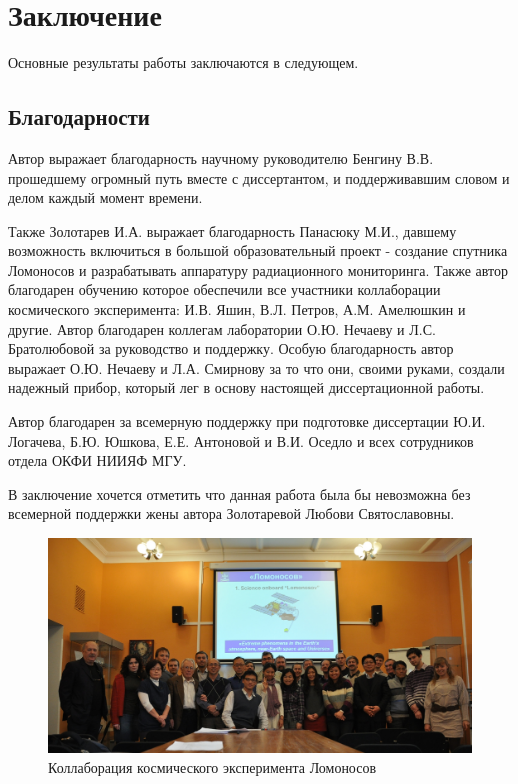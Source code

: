 \chapter*{Заключение}						%


Основные результаты работы заключаются в следующем.

\section{Благодарности}
Автор выражает благодарность научному руководителю Бенгину В.В. прошедшему огромный путь вместе с диссертантом, и поддерживавшим словом и делом каждый момент времени. 

Также Золотарев И.А. выражает благодарность Панасюку М.И., давшему возможность включиться в большой образовательный проект - создание спутника Ломоносов и разрабатывать аппаратуру радиационного мониторинга. Также автор благодарен обучению которое обеспечили  все участники коллаборации космического эксперимента:  И.В. Яшин,  В.Л. Петров,  А.М. Амелюшкин и другие.  Автор благодарен коллегам  лаборатории  О.Ю. Нечаеву и  Л.С. Братолюбовой за руководство и поддержку. Особую благодарность автор выражает  О.Ю. Нечаеву и  Л.А. Смирнову за то что они,  своими руками, создали надежный прибор, который лег в основу настоящей диссертационной работы.

Автор благодарен за всемерную поддержку при подготовке диссертации  Ю.И. Логачева,  Б.Ю. Юшкова, Е.Е. Антоновой и  В.И. Оседло и всех сотрудников отдела ОКФИ НИИЯФ МГУ.  

В заключение хочется отметить что данная работа была бы невозможна без всемерной поддержки жены автора Золотаревой Любови Святославовны.

\begin{figure}
	\centering
	\includegraphics[width=0.7\linewidth]{images/collab}
	\caption{Коллаборация космического эксперимента Ломоносов}
	\label{fig:collab}
\end{figure}
